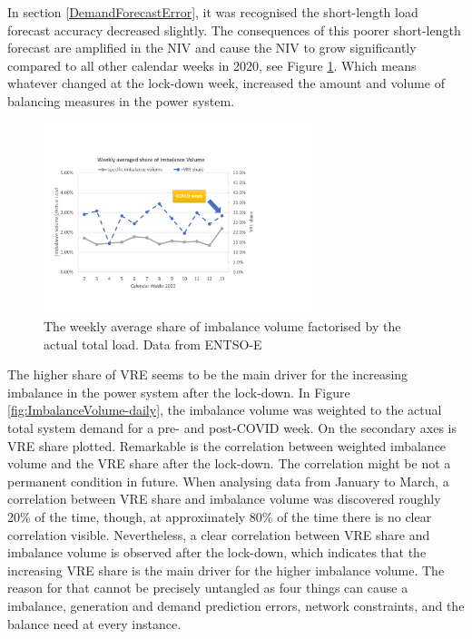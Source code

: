 \documentclass[energies,article,submit,moreauthors,pdftex]{Definitions/mdpi}
\begin{document}
In section \ref{DemandForecastError}, it was recognised the short-length load forecast accuracy decreased slightly. The consequences of this poorer short-length forecast are amplified in the NIV and cause the NIV to grow significantly compared to all other calendar weeks in 2020, see Figure \ref{fig:ImbalanceVolume_over_2020}. Which means whatever changed at the lock-down week, increased the amount and volume of balancing measures in the power system.


\begin{figure}[H]
\centering
\hspace{-25pt}\includegraphics[trim={0cm 2cm 6.5cm 3.5cm},clip,width=0.7\textwidth]{Graphics/Illustration-Imbalance-2020.pdf}
\caption{The weekly average share of imbalance volume factorised by the actual total load. Data from ENTSO-E \protect\cite{ENTSO-E2020ENTSO-EPlatform}}
\label{fig:ImbalanceVolume_over_2020}
\end{figure} 

The higher share of VRE seems to be the main driver for the increasing imbalance in the power system after the lock-down. In Figure \ref{fig:ImbalanceVolume-daily}, the imbalance volume was weighted to the actual total system demand for a pre- and post-COVID week. On the secondary axes is VRE share plotted. Remarkable is the correlation between weighted imbalance volume and the VRE share after the lock-down. The correlation might be not a permanent condition in future. When analysing data from January to March, a correlation between VRE share and imbalance volume was discovered roughly 20\% of the time, though, at approximately 80\% of the time there is no clear correlation visible. Nevertheless, a clear correlation between VRE share and imbalance volume is observed after the lock-down, which indicates that the increasing VRE share is the main driver for the higher imbalance volume. The reason for that cannot be precisely untangled as four things can cause a imbalance, generation and demand prediction errors, network constraints, and the balance need at every instance. 
\end{document}

